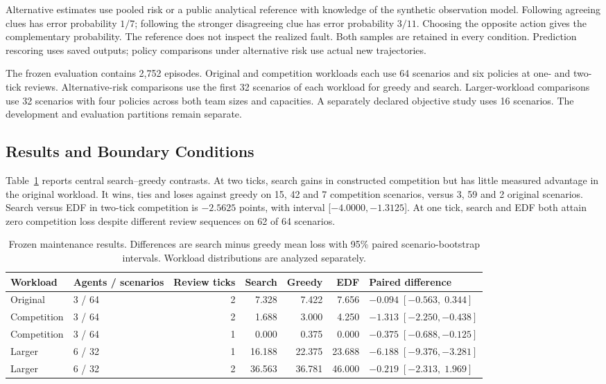 Alternative estimates use pooled risk or a public analytical reference with knowledge of the synthetic observation model. Following agreeing clues has error probability $1/7$; following the stronger disagreeing clue has error probability $3/11$. Choosing the opposite action gives the complementary probability. The reference does not inspect the realized fault. Both samples are retained in every condition. Prediction rescoring uses saved outputs; policy comparisons under alternative risk use actual new trajectories.

The frozen evaluation contains 2,752 episodes. Original and competition workloads each use 64 scenarios and six policies at one- and two-tick reviews. Alternative-risk comparisons use the first 32 scenarios of each workload for greedy and search. Larger-workload comparisons use 32 scenarios with four policies across both team sizes and capacities. A separately declared objective study uses 16 scenarios. The development and evaluation partitions remain separate.

\subsection{Results and Boundary Conditions}
Table~\ref{tab:maintenance} reports central search--greedy contrasts. At two ticks, search gains in constructed competition but has little measured advantage in the original workload. It wins, ties and loses against greedy on 15, 42 and 7 competition scenarios, versus 3, 59 and 2 original scenarios. Search versus EDF in two-tick competition is $-2.5625$ points, with interval [$-4.0000,-1.3125$]. At one tick, search and EDF both attain zero competition loss despite different review sequences on 62 of 64 scenarios.

\begin{table}[t]
\caption{Frozen maintenance results. Differences are search minus greedy mean loss with 95\% paired scenario-bootstrap intervals. Workload distributions are analyzed separately.}
\label{tab:maintenance}\centering\small
\begin{tabular}{llrrrrl}
\toprule
Workload & Agents / scenarios & Review ticks & Search & Greedy & EDF & Paired difference \\
\midrule
Original & 3 / 64 & 2 & 7.328 & 7.422 & 7.656 & $-0.094\;[-0.563,\;0.344]$ \\
Competition & 3 / 64 & 2 & 1.688 & 3.000 & 4.250 & $-1.313\;[-2.250,-0.438]$ \\
Competition & 3 / 64 & 1 & 0.000 & 0.375 & 0.000 & $-0.375\;[-0.688,-0.125]$ \\
Larger & 6 / 32 & 1 & 16.188 & 22.375 & 23.688 & $-6.188\;[-9.376,-3.281]$ \\
Larger & 6 / 32 & 2 & 36.563 & 36.781 & 46.000 & $-0.219\;[-2.313,\;1.969]$ \\
\bottomrule
\end{tabular}
\end{table}

